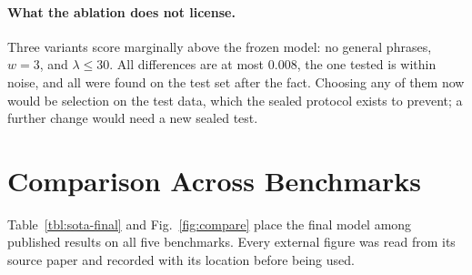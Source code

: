 \documentclass[a4paper,fleqn]{cas-sc}
\begin{document}
\paragraph{What the ablation does not license.} Three variants score marginally above the
frozen model: no general phrases, $w=3$, and $\lambda\le30$. All differences are at most
$0.008$, the one tested is within noise, and all were found on the test set after the
fact. Choosing any of them now would be selection on the test data, which the sealed
protocol exists to prevent; a further change would need a new sealed test.

\section{Comparison Across Benchmarks}
\label{sec:compare}

Table~\ref{tbl:sota-final} and Fig.~\ref{fig:compare} place the final model among
published results on all five benchmarks. Every external figure was read from its
source paper and recorded with its location before being used.
\end{document}
